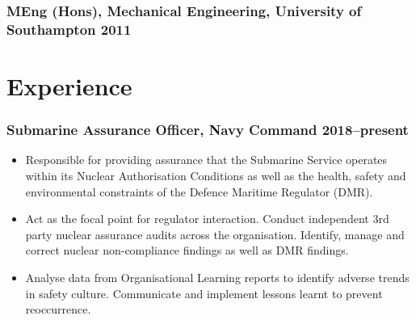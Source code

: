 \documentclass[a4paper, oneside, final, 11pt]{scrartcl} %
\begin{document}
\subsubsection*{MEng (Hons), Mechanical Engineering, University of Southampton \hfill 2011} 
\medskip


\section{Experience}

\subsubsection*{Submarine Assurance Officer, Navy Command \hfill 2018--present}  
\normalfont
\begin{itemize}

\item Responsible for providing
assurance that the Submarine Service operates within its Nuclear Authorisation Conditions as well as the health, safety and environmental constraints of the Defence Maritime Regulator (DMR).

\item Act as the focal point for regulator interaction. Conduct independent 3rd party nuclear assurance audits across the organisation. Identify, manage and correct nuclear non-compliance findings as well as DMR findings.

\item Analyse data from Organisational Learning reports to identify adverse trends in safety culture. Communicate and implement lessons learnt to prevent reoccurrence. 

\end{itemize}

\smallskip 
\end{document}
